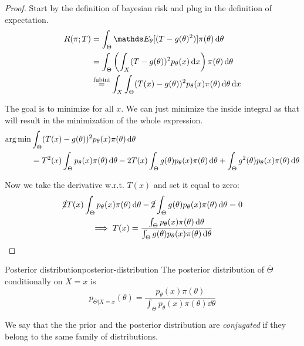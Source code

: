 \documentclass[12pt]{extarticle}
\begin{document}
\begin{proof}
	Start by the definition of bayesian risk and plug in the definition of expectation.
	\begin{align}
		R(\pi; T) & = \int_\Theta \E_\theta[(T-g(\theta)^2)] \pi(\theta) \dd{\theta}                                              \\
		          & = \int_\Theta \left(\int_X (T-g(\theta))^2 p_\theta(x)\dd{x} \right) \pi(\theta) \dd{\theta}                  \\
		          & \stackrel{\text{fubini}}{=} \int_X \int_\Theta (T(x) - g(\theta))^2 p_\theta(x) \pi(\theta) \dd{\theta}\dd{x}
	\end{align}

	The goal is to minimize for all $x$. We can just minimize the inside integral as that will result in the minimization of the whole expression.
	\begin{align}
		\operatorname*{arg\,min} & \int_\Theta (T(x) - g(\theta))^2 p_\theta(x) \pi(\theta) \dd{\theta}                                                                                                                    \\
		        & = T^2(x) \int_\Theta p_\theta(x) \pi(\theta) \dd{\theta}- 2T(x) \int_\Theta g(\theta) p_\theta(x) \pi(\theta) \dd{\theta} + \int_\Theta g^2(\theta) p_\theta(x) \pi(\theta) \dd{\theta}
	\end{align}

	Now we take the derivative w.r.t. $T(x)$ and set it equal to zero:
	\begin{gather}
		\cancel 2 T(x) \int_\Theta p_\theta(x) \pi(\theta) \dd{\theta}- \cancel 2 \int_\Theta g(\theta) p_\theta(x) \pi(\theta) \dd{\theta} = 0 \\
		\implies T(x) = \frac{\int_\Theta p_\theta(x) \pi(\theta) \dd{\theta}}{\int_\Theta g(\theta) p_\theta(x) \pi(\theta) \dd{\theta}}
	\end{gather}
\end{proof}

\begin{definition}{Posterior distribution}{posterior-distribution}
	The posterior distribution of $\bar \Theta$ conditionally on $X = x$ is
	\begin{equation}
		p_{\bar \Theta | X = x} (\theta) = \frac{p_\theta(x) \pi(\theta)}{\int_\Theta p_\theta(x) \pi(\theta) \dd{\theta}}
	\end{equation}
\end{definition}

We say that the the prior and the posterior distribution are \emph{conjugated} if they belong to the same family of distributions.
\end{document}
